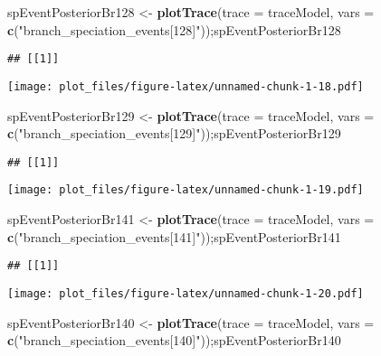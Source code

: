 \documentclass[
]{article}
\newenvironment{Shaded}{\begin{snugshade}}{\end{snugshade}}
\newcommand{\AttributeTok}[1]{\textcolor[rgb]{0.13,0.29,0.53}{#1}}
\newcommand{\FunctionTok}[1]{\textcolor[rgb]{0.13,0.29,0.53}{\textbf{#1}}}
\newcommand{\NormalTok}[1]{#1}
\newcommand{\OtherTok}[1]{\textcolor[rgb]{0.56,0.35,0.01}{#1}}
\newcommand{\StringTok}[1]{\textcolor[rgb]{0.31,0.60,0.02}{#1}}
\begin{document}
\begin{Shaded}
\begin{Highlighting}[]
\NormalTok{spEventPosteriorBr128 }\OtherTok{\textless{}{-}} \FunctionTok{plotTrace}\NormalTok{(}\AttributeTok{trace =}\NormalTok{ traceModel, }
                              \AttributeTok{vars =} \FunctionTok{c}\NormalTok{(}\StringTok{"branch\_speciation\_events[128]"}\NormalTok{));spEventPosteriorBr128}
\end{Highlighting}
\end{Shaded}

\begin{verbatim}
## [[1]]
\end{verbatim}

\texttt{[image: plot\_files/figure-latex/unnamed-chunk-1-18.pdf]}

\begin{Shaded}
\begin{Highlighting}[]
\NormalTok{spEventPosteriorBr129 }\OtherTok{\textless{}{-}} \FunctionTok{plotTrace}\NormalTok{(}\AttributeTok{trace =}\NormalTok{ traceModel, }
                              \AttributeTok{vars =} \FunctionTok{c}\NormalTok{(}\StringTok{"branch\_speciation\_events[129]"}\NormalTok{));spEventPosteriorBr129}
\end{Highlighting}
\end{Shaded}

\begin{verbatim}
## [[1]]
\end{verbatim}

\texttt{[image: plot\_files/figure-latex/unnamed-chunk-1-19.pdf]}

\begin{Shaded}
\begin{Highlighting}[]
\NormalTok{spEventPosteriorBr141 }\OtherTok{\textless{}{-}} \FunctionTok{plotTrace}\NormalTok{(}\AttributeTok{trace =}\NormalTok{ traceModel, }
                              \AttributeTok{vars =} \FunctionTok{c}\NormalTok{(}\StringTok{"branch\_speciation\_events[141]"}\NormalTok{));spEventPosteriorBr141}
\end{Highlighting}
\end{Shaded}

\begin{verbatim}
## [[1]]
\end{verbatim}

\texttt{[image: plot\_files/figure-latex/unnamed-chunk-1-20.pdf]}

\begin{Shaded}
\begin{Highlighting}[]
\NormalTok{spEventPosteriorBr140 }\OtherTok{\textless{}{-}} \FunctionTok{plotTrace}\NormalTok{(}\AttributeTok{trace =}\NormalTok{ traceModel, }
                              \AttributeTok{vars =} \FunctionTok{c}\NormalTok{(}\StringTok{"branch\_speciation\_events[140]"}\NormalTok{));spEventPosteriorBr140}
\end{Highlighting}
\end{Shaded}
\end{document}
